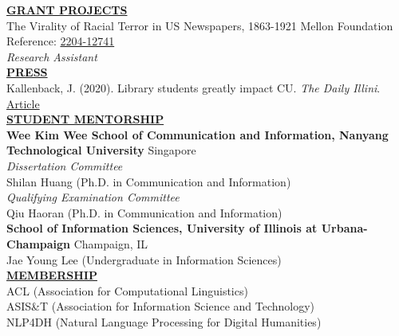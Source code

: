 \documentclass{article}
\begin{document}
\noindent \textbf{\underline{GRANT PROJECTS}} \\
\noindent The Virality of Racial Terror in US Newspapers, 1863-1921 \hfill Mellon Foundation Reference: \href{https://www.mellon.org/grant-details/the-virality-of-racial-terror-in-us-newspapers-1863-1921-20452145}{2204-12741}  \\
\textit{Research Assistant} \\


\noindent \textbf{\underline{PRESS}} \\
\noindent Kallenback, J. (2020). Library students greatly impact CU. \textit{The Daily Illini}. \hfill \href{https://dailyillini.com/life_and_culture-stories/2020/11/11/library-students-greatly-impact-cu/}{Article} \\


\noindent \textbf{\underline{STUDENT MENTORSHIP}} \\
\noindent \textbf{Wee Kim Wee School of Communication and Information, Nanyang Technological University} \hfill Singapore \\
\noindent \textit{Dissertation Committee} \\
\noindent Shilan Huang (Ph.D. in Communication and Information) \\

\noindent \textit{Qualifying Examination Committee} \\
\noindent Qiu Haoran (Ph.D. in Communication and Information) \\

\noindent \textbf{School of Information Sciences, University of Illinois at Urbana-Champaign} \hfill Champaign, IL \\
\noindent Jae Young Lee (Undergraduate in Information Sciences) \\


\noindent \textbf{\underline{MEMBERSHIP}} \\ 
\noindent ACL (Association for Computational Linguistics) \\
\noindent ASIS\&T (Association for Information Science and Technology) \\
\noindent NLP4DH (Natural Language Processing for Digital Humanities) \\
\end{document}

